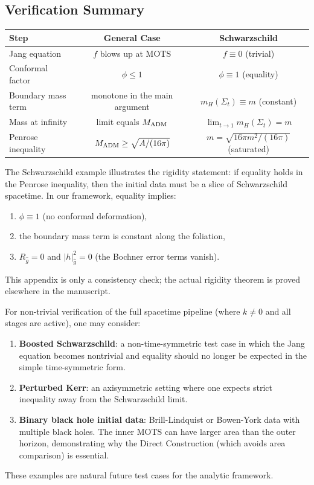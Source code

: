\subsection{Verification Summary}
\begin{center}
\begin{tabular}{|l|c|c|}
\hline
\textbf{Step} & \textbf{General Case} & \textbf{Schwarzschild} \\
\hline
Jang equation & $f$ blows up at MOTS & $f \equiv 0$ (trivial) \\
Conformal factor & $\phi \le 1$ & $\phi \equiv 1$ (equality) \\
Boundary mass term & monotone in the main argument & $m_H(\Sigma_t) \equiv m$ (constant) \\
Mass at infinity & limit equals $M_{\mathrm{ADM}}$ & $\lim_{t \to 1} m_H(\Sigma_t) = m$ \\
Penrose inequality & $M_{\mathrm{ADM}} \ge \sqrt{A/(16\pi)}$ & $m = \sqrt{16\pi m^2/(16\pi)}$ (saturated) \\
\hline
\end{tabular}
\end{center}

\begin{remark}[Rigidity]
The Schwarzschild example illustrates the rigidity statement: if equality holds in the Penrose inequality, then the initial data must be a slice of Schwarzschild spacetime. In our framework, equality implies:
\begin{enumerate}
    \item $\phi \equiv 1$ (no conformal deformation),
    \item the boundary mass term is constant along the foliation,
    \item $R_{\hat{g}} = 0$ and $|h|_{\hat{g}}^2 = 0$ (the Bochner error terms vanish).
\end{enumerate}
This appendix is only a consistency check; the actual rigidity theorem is proved elsewhere in the manuscript.
\end{remark}

\begin{remark}
For non-trivial verification of the full spacetime pipeline (where $k \neq 0$ and all stages are active), one may consider:
\begin{enumerate}
    \item \textbf{Boosted Schwarzschild}: a non-time-symmetric test case in which the Jang equation becomes nontrivial and equality should no longer be expected in the simple time-symmetric form.
    \item \textbf{Perturbed Kerr}: an axisymmetric setting where one expects strict inequality away from the Schwarzschild limit.
    \item \textbf{Binary black hole initial data}: Brill-Lindquist or Bowen-York data with multiple black holes. The inner MOTS can have larger area than the outer horizon, demonstrating why the Direct Construction (which avoids area comparison) is essential.
\end{enumerate}
These examples are natural future test cases for the analytic framework.
\end{remark}


